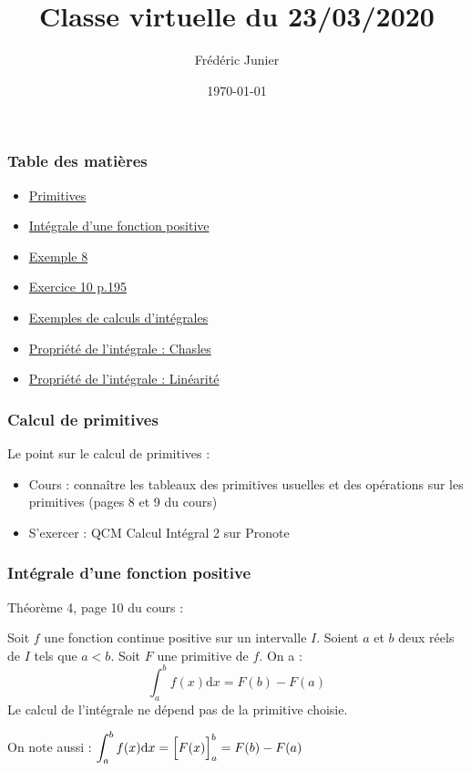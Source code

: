 \documentclass[11pt, hyperref={urlcolor=red,%
            linkcolor=blue, %
            colorlinks=true}]{beamer}
\title[exponentielle]{Classe virtuelle du 23/03/2020}
\author[F.Junier]{Fr\'ed\'eric Junier}
\institute[Le Parc]{{\centering Lyc\'ee du Parc \\
1 Boulevard Anatole France \\ 69006 Lyon }}
\date[\today]{\today}
\newcommand{\dx}{\ensuremath{\text{d}x}}		%
\begin{document}
\frame{\titlepage}




\begin{frame}
\frametitle{Table des matières}
\begin{itemize}
	\item \hyperlink{primitives}{Primitives}
		\item \hyperlink{integrale}{Intégrale d'une fonction positive}
			\item \hyperlink{exemple8}{Exemple 8}
		\item \hyperlink{exo10}{Exercice 10 p.195}
		\item \hyperlink{calcint}{Exemples de calculs d'intégrales}
		\item \hyperlink{chasles}{Propriété de l'intégrale : Chasles}
	    \item \hyperlink{chasles}{Propriété de l'intégrale : Linéarité}
\end{itemize}

\end{frame}

\begin{frame}
\frametitle{Calcul de primitives}
\label{primitives}

Le point sur le calcul de primitives :

\begin{itemize}
  \item Cours : connaître les tableaux des primitives usuelles et des opérations sur les primitives (pages 8 et 9 du cours)
  \item S'exercer : QCM Calcul Intégral 2 sur Pronote
\end{itemize}

\end{frame}



\begin{frame}
\frametitle{Intégrale d'une fonction positive}
\label{integrale}

Théorème 4, page 10 du cours :

\begin{theorem}
Soit $f$ une fonction continue positive  sur un intervalle $I$. Soient $a$ et $b$ deux réels de $I$ tels que $a<b$. Soit $F$ une primitive de $f$. On a :\\
\[\displaystyle\int_{a}^{b}f(x)\dx=F(b)-F(a)\]
Le calcul de l'intégrale ne dépend pas de la primitive choisie.

On note aussi : $\displaystyle\int_{a}^{b}f(x)\dx=\Bigl[F(x)\Bigr]_{a}^{b}=F(b)-F(a)$


\end{theorem}

\end{frame}
\end{document}
